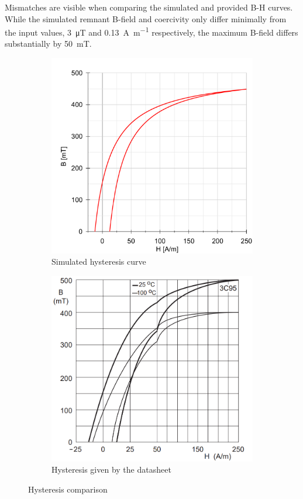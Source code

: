 Mismatches are visible when comparing the simulated and provided B-H curves. While the simulated remnant B-field and coercivity only differ minimally from the input values, \SI{3}{\micro\tesla} and \SI{0.13}{\A\per\m} respectively, the maximum B-field differs substantially by \SI{50}{\milli\tesla}.
\begin{figure}[H]
    \begin{subfigure}[b]{0.50\textwidth}
        \includegraphics[width=\textwidth]{Bilder/Kapitel3/Hysteresis_LTspice_2.pdf}
        \caption{Simulated hysteresis curve}
    \end{subfigure}
    \begin{subfigure}[b]{0.50\textwidth}
        \includegraphics[width=\textwidth]{Bilder/Kapitel3/DataSheet_Hysteresis_Curve.png}
        \caption{Hysteresis given by the datasheet}
    \end{subfigure}
    \caption{Hysteresis comparison}
    \label{fig:hysteresis_comparison}							
\end{figure}
